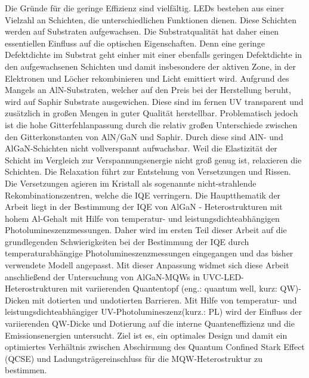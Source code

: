 Die Gründe für die geringe Effizienz sind vielfältig. LEDs bestehen aus einer Vielzahl an Schichten, die unterschiedlichen Funktionen dienen. Diese Schichten werden auf Substraten aufgewachsen. Die Substratqualität hat daher einen essentiellen Einfluss auf die optischen Eigenschaften. Denn eine geringe Defektdichte im Substrat geht einher mit einer ebenfalls geringen Defektdichte in den aufgewachsenen Schichten und damit insbesondere der aktiven Zone, in der Elektronen und Löcher rekombinieren und Licht emittiert wird.
\newline
Aufgrund des Mangels an AlN-Substraten, welcher auf den Preis bei der Herstellung beruht, wird auf Saphir Substrate ausgewichen. Diese sind im fernen UV transparent und zusätzlich in großen Mengen in guter Qualität herstellbar. Problematisch jedoch ist die hohe Gitterfehlanpassung durch die relativ großen Unterschiede zwischen den Gitterkonstanten von AlN/GaN und Saphir. Durch diese sind AlN- und AlGaN-Schichten nicht vollverspannt aufwachsbar. Weil die Elastizität der Schicht im Vergleich zur Verspannungsenergie nicht groß genug ist, relaxieren die Schichten. Die Relaxation führt zur Entstehung von Versetzungen und Rissen. Die Versetzungen agieren im Kristall als sogenannte nicht-strahlende Rekombinationszentren, welche die IQE verringern. 
\newline
Die Hauptthematik der Arbeit liegt in der Bestimmung der IQE von AlGaN - Heterostrukturen mit hohem Al-Gehalt mit Hilfe von temperatur- und leistungsdichteabhängigen Photolumineszenzmessungen.
Daher wird im ersten Teil dieser Arbeit auf die grundlegenden Schwierigkeiten bei der Bestimmung der IQE durch temperaturabhängige Photolumineszenzmessungen eingegangen und das bisher verwendete Modell angepasst. 
\newline
Mit dieser Anpassung widmet sich diese Arbeit anschließend der Untersuchung von AlGaN-MQWs in UVC-LED-Heterostrukturen mit variierenden Quantentopf (eng.: quantum well, kurz: QW)-Dicken mit dotierten und undotierten Barrieren. Mit Hilfe von temperatur- und leistungsdichteabhängiger UV-Photolumineszenz(kurz.: PL) wird der Einfluss der variierenden QW-Dicke und Dotierung auf die interne Quanteneffizienz und die Emissionsenergien untersucht. Ziel ist es, ein optimales Design und damit ein optimiertes Verhältnis zwischen Abschirmung des Quantum Confined Stark Effect (QCSE) und Ladungsträgereinschluss für die MQW-Heterostruktur zu bestimmen.
\newline

